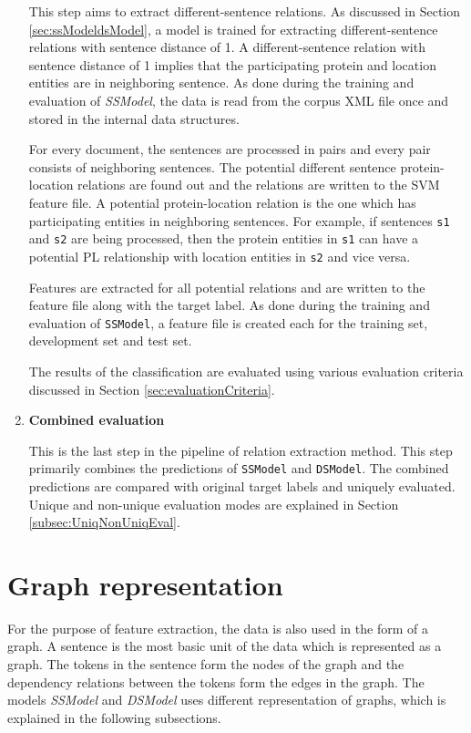 \begin{enumerate}
This step aims to extract different-sentence relations. As discussed in Section \ref{sec:ssModeldsModel}, a model is trained for extracting different-sentence relations with sentence distance of 1. A different-sentence relation with sentence distance of 1 implies that the participating protein and location entities are in neighboring sentence. As done during the training and evaluation of \textit{SSModel}, the data is read from the corpus XML file once and stored in the internal data structures.

For every document, the sentences are processed in pairs and every pair consists of neighboring sentences. The potential different sentence protein-location relations are found out and the relations are written to the SVM feature file. A potential protein-location relation is the one which has participating entities in  neighboring sentences. For example, if sentences \texttt{s1} and \texttt{s2} are being processed, then the protein entities in \texttt{s1} can have a potential PL relationship with location entities in \texttt{s2} and vice versa.

Features are extracted for all potential relations and are written to the feature file along with the target label. As done during the training and evaluation of \texttt{SSModel}, a feature file is created each for the training set, development set and test set. 

The results of the classification are evaluated using various evaluation criteria discussed in Section \ref{sec:evaluationCriteria}.

\item \textbf{Combined evaluation}

This is the last step in the pipeline of relation extraction method. This step primarily combines the predictions of \texttt{SSModel} and \texttt{DSModel}. The  combined predictions are compared with original target labels and uniquely evaluated. Unique and non-unique evaluation modes are explained in Section \ref{subsec:UniqNonUniqEval}.

\end{enumerate}

\section{Graph representation} \label{sec:graphRep}

For the purpose of feature extraction, the data is also used in the form of a graph. A sentence is the most basic unit of the data which is represented as a graph. The tokens in the sentence form the nodes of the graph and the dependency relations between the tokens form the edges in the graph. The models \textit{SSModel} and \textit{DSModel} uses different representation of graphs,  which is explained in the following subsections.

